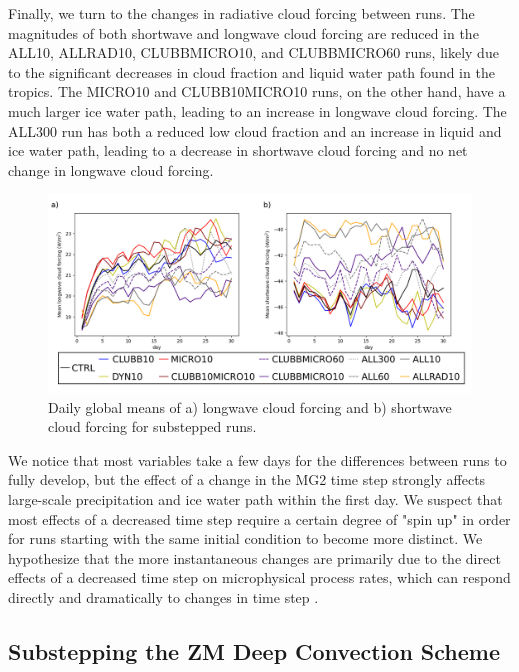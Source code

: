 \documentclass [11pt, proquest] {uwthesis}[2020/02/24]
\begin{document}
Finally, we turn to the changes in radiative cloud forcing between runs. The magnitudes of both shortwave and longwave cloud forcing are reduced in the ALL10, ALLRAD10, CLUBBMICRO10, and CLUBBMICRO60 runs, likely due to the significant decreases in cloud fraction and liquid water path found in the tropics. The MICRO10 and CLUBB10MICRO10 runs, on the other hand, have a much larger ice water path, leading to an increase in longwave cloud forcing. The ALL300 run has both a reduced low cloud fraction and an increase in liquid and ice water path, leading to a decrease in shortwave cloud forcing and no net change in longwave cloud forcing.

\begin{figure}
    \centering
    \includegraphics[width=6.5in]{Figure12.png}
    \caption[Radiative cloud forcing over time for short EAMv1 runs using different forms of substepping]{Daily global means of a) longwave cloud forcing and b) shortwave cloud forcing for substepped runs.}
    \label{fig:cld-frc}
\end{figure}

We notice that most variables take a few days for the differences between runs to fully develop, but the effect of a change in the MG2 time step strongly affects large-scale precipitation and ice water path within the first day. We suspect that most effects of a decreased time step require a certain degree of "spin up" in order for runs starting with the same initial condition to become more distinct. We hypothesize that the more instantaneous changes are primarily due to the direct effects of a decreased time step on microphysical process rates, which can respond directly and dramatically to changes in time step \parencite{Santos2020}.

\subsection{Substepping the ZM Deep Convection Scheme}
\end{document}
